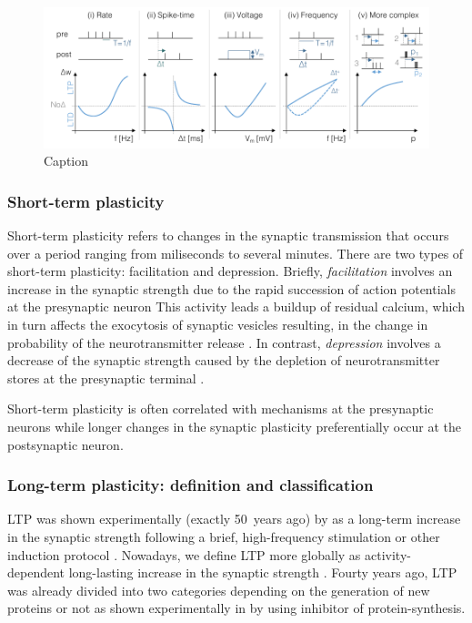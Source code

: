 \begin{figure}[h!]
    \centering
    \includegraphics[scale=0.9]{latex/fig/Intro/SP_Protocols.pdf}
    \caption{Caption}
    \label{fig:SP_Protocols}
\end{figure}



\subsubsection{Short-term plasticity}
Short-term plasticity refers to changes in the synaptic transmission that occurs over a period ranging from miliseconds to several minutes. There are two types of short-term plasticity: facilitation and depression. Briefly, \textit{facilitation} involves an increase in the synaptic strength due to the rapid succession of action potentials at the presynaptic neuron \citep{castro-alamancos_distinct_1997}  This activity leads a buildup of residual calcium, which in turn  affects the exocytosis of synaptic vesicles resulting, in the change in probability of the neurotransmitter release \citep{citri_synaptic_2008}. In contrast, \textit{depression} involves a decrease of the synaptic strength caused by the depletion of neurotransmitter stores at the presynaptic terminal \citep{heidelberger_synaptic_2014}.

Short-term plasticity is often correlated with mechanisms at the presynaptic neurons while longer changes in the synaptic plasticity preferentially occur at the postsynaptic neuron. 



\subsubsection{Long-term plasticity: definition and classification}
\acrfull{LTP} was shown experimentally (exactly 50~years ago) by\citep{bliss_long-lasting_1973} as a long-term increase in the synaptic strength following a brief, high-frequency stimulation or other induction protocol \citep{baltaci_molecular_2019}. Nowadays, we define \acrshort{LTP} more globally as activity-dependent long-lasting increase in the synaptic strength \citep{abraham_is_2019, citri_synaptic_2008}. Fourty years ago,  \acrshort{LTP} was already divided into two categories depending on the generation of new proteins or not as shown experimentally in  \citep{frey_effects_1993, krug_anisomycin_1984} by using inhibitor of protein-synthesis.

